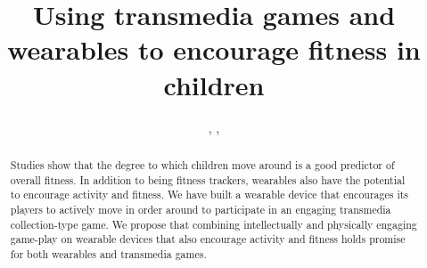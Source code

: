\documentclass{SIGCHI2015LaTex/sigchi}
\begin{document}
\title{Using transmedia games and wearables to encourage fitness in children}


\author{
, 
,
}





\maketitle

\begin{abstract}

Studies show that the degree to which children move around is a good predictor of overall fitness. In addition to being fitness trackers, wearables also have the potential to encourage activity and fitness. We have built a wearable device that encourages its players to actively move in order around to participate in an engaging transmedia collection-type game. We propose that combining intellectually and physically engaging game-play on wearable devices that also encourage activity and fitness holds promise for both wearables and transmedia games.

\end{abstract}
\end{document}
